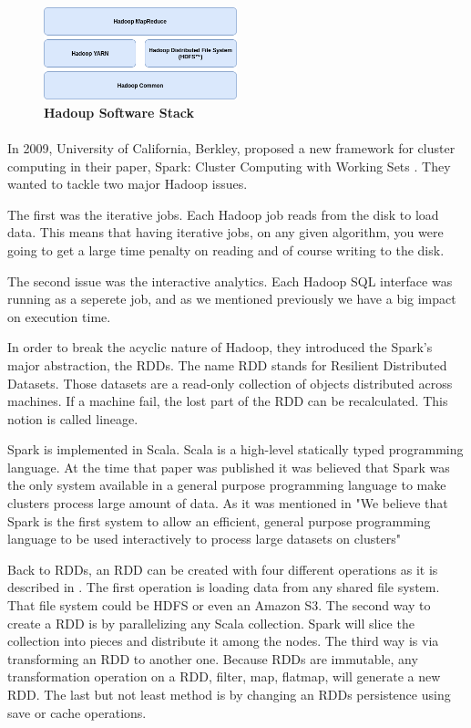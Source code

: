 \begin{figure}[h]
	\centering
	\includegraphics[width=0.5\textwidth]{images/hadoop-stack.png}
	\caption{\bfseries Hadoup Software Stack}
	\label{hadoopStack}
\end{figure}



\paragraph{} In 2009, University of California, Berkley, proposed a new framework for cluster computing in their paper, Spark: Cluster Computing with Working Sets \cite{Zaharia:2010:SCC:1863103.1863113}. They wanted to tackle two major Hadoop issues. 

The first was the iterative jobs. Each Hadoop job reads from the disk to load data. This means that having iterative jobs, on any given algorithm, you were going to get a large time penalty on reading and of course writing to the disk. 

The second issue was the interactive analytics. Each Hadoop SQL interface was running as a seperete job, and as we mentioned previously we have a big impact on execution time.

In order to break the acyclic nature of Hadoop, they introduced the Spark's major abstraction, the RDDs. The name RDD stands for Resilient Distributed Datasets. Those datasets are a read-only collection of objects distributed across machines. If a machine fail, the lost part of the RDD can be recalculated. This notion is called lineage.

Spark is implemented in Scala. Scala is a high-level statically typed programming language. At the time that paper was published it was believed that Spark was the only system available in a general purpose programming language to make clusters process large amount of data. As it was mentioned in \cite{Zaharia:2010:SCC:1863103.1863113} "We believe that Spark is the first system to allow an efficient, general purpose programming language to be used interactively to process large datasets on clusters"

Back to RDDs, an RDD can be created with four different operations as it is described in \cite{Zaharia:2010:SCC:1863103.1863113}. The first operation is loading data from any shared file system. That file system could be HDFS or even an Amazon S3. The second way to create a RDD is by parallelizing any Scala collection. Spark will slice the collection into pieces and distribute it among the nodes. The third way is via transforming an RDD to another one. Because RDDs are immutable, any transformation operation on a RDD, filter, map, flatmap, will generate a new RDD. The last but not least method is by changing an RDDs persistence using save or cache operations.


